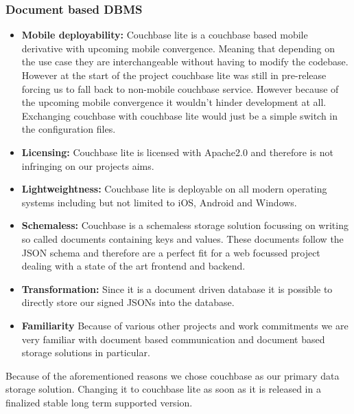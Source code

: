 \subsubsection{Document based DBMS}
\label{databaseDBMS}
\begin{itemize}
\item \label{doc_req_one} \textbf{Mobile deployability:}
Couchbase lite is a couchbase based mobile derivative with upcoming mobile convergence. Meaning that depending on the use case they are interchangeable without having to modify the codebase.
However at the start of the project couchbase lite was still in pre-release forcing us to fall back to non-mobile couchbase service. However because of the upcoming mobile convergence it wouldn't hinder development at all.
Exchanging couchbase with couchbase lite would just be a simple switch in the configuration files.
\item \label{doc_req_two} \textbf{Licensing:}
Couchbase lite is licensed with Apache2.0 and therefore is not infringing on our projects aims.
\item \label{doc_item_three} \textbf{Lightweightness:}
Couchbase lite is deployable on all modern operating systems including but not limited to iOS, Android and Windows.
\item \label{doc_req_four} \textbf{Schemaless:}
Couchbase is a schemaless storage solution focussing on writing so called documents containing keys and values. These documents follow the JSON schema and therefore are a perfect fit for a web focussed project dealing with a state of the art frontend and backend.
\item \label{doc_req_five} \textbf{Transformation:}
Since it is a document driven database it is possible to directly store our signed JSONs into the database.
\item \label{doc_req_six} \textbf{Familiarity}
Because of various other projects and work commitments we are very familiar with document based communication and document based storage solutions in particular.
\end{itemize}
Because of the aforementioned reasons we chose couchbase as our primary data storage solution. Changing it to couchbase lite as soon as it is released in a finalized stable long term supported version.

